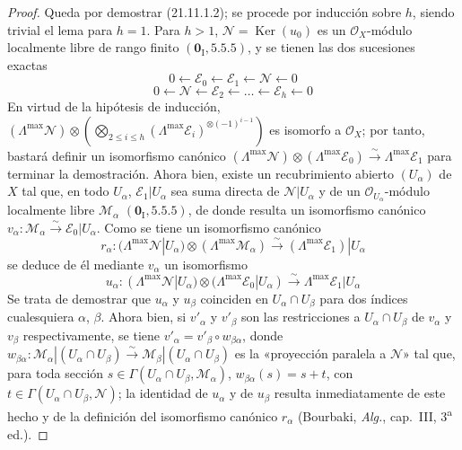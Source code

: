 \begin{proof}
Queda por demostrar (21.11.1.2); se procede por inducción sobre $h$, siendo trivial el lema
para $h=1$. Para $h>1$, $\mathscr N=\operatorname{Ker}(u_0)$ es un
$\mathcal O_X$-módulo localmente libre de rango finito $(\mathbf 0_{\mathrm I}, 5.5.5)$,
y se tienen las dos sucesiones exactas
\[
  0\leftarrow\mathscr E_0\leftarrow\mathscr E_1
  \leftarrow\mathscr N\leftarrow0
\]
\[
  0\leftarrow\mathscr N\leftarrow\mathscr E_2
  \leftarrow\ldots\leftarrow\mathscr E_h\leftarrow0
\]
En virtud de la hipótesis de inducción,
$(\Lambda^{\max}\mathscr N)\otimes
(\bigotimes_{2\leq i\leq h}(\Lambda^{\max}\mathscr E_i)^{\otimes(-1)^{i-1}})$
es isomorfo a $\mathcal O_X$; por tanto, bastará definir un isomorfismo canónico
$(\Lambda^{\max}\mathscr N)\otimes(\Lambda^{\max}\mathscr E_0)\xrightarrow{\sim}\Lambda^{\max}\mathscr E_1$
para terminar la demostración. Ahora bien, existe un recubrimiento abierto $(U_\alpha)$ de
$X$ tal que, en todo $U_\alpha$, $\mathscr E_1|U_\alpha$ sea suma directa de
$\mathscr N|U_\alpha$ y de un $\mathcal O_{U_\alpha}$-módulo localmente libre
$\mathscr M_\alpha$ $(\mathbf 0_{\mathrm I}, 5.5.5)$, de donde resulta un isomorfismo canónico
$v_\alpha:\mathscr M_\alpha\xrightarrow{\sim}\mathscr E_0|U_\alpha$.
Como se tiene un isomorfismo canónico
\[
  r_\alpha:(\Lambda^{\max}\mathscr N|U_\alpha)
  \otimes(\Lambda^{\max}\mathscr M_\alpha)
  \xrightarrow{\sim}(\Lambda^{\max}\mathscr E_1)|U_\alpha
\]
se deduce de él mediante $v_\alpha$ un isomorfismo
\[
  u_\alpha:(\Lambda^{\max}\mathscr N|U_\alpha)
  \otimes(\Lambda^{\max}\mathscr E_0|U_\alpha)
  \xrightarrow{\sim}\Lambda^{\max}\mathscr E_1|U_\alpha
\]
Se trata de demostrar que $u_\alpha$ y $u_\beta$ coinciden en
$U_\alpha\cap U_\beta$ para dos índices cualesquiera $\alpha$, $\beta$. Ahora bien, si
$v'_\alpha$ y $v'_\beta$ son las restricciones a $U_\alpha\cap U_\beta$ de
$v_\alpha$ y $v_\beta$ respectivamente, se tiene
$v'_\alpha=v'_\beta\circ w_{\beta\alpha}$, donde
$w_{\beta\alpha}:\mathscr M_\alpha|(U_\alpha\cap U_\beta)\xrightarrow{\sim}\mathscr M_\beta|(U_\alpha\cap U_\beta)$
es la «proyección paralela a $\mathscr N$» tal que, para toda sección
$s\in\Gamma(U_\alpha\cap U_\beta,\mathscr M_\alpha)$,
$w_{\beta\alpha}(s)=s+t$, con
$t\in\Gamma(U_\alpha\cap U_\beta,\mathscr N)$; la identidad de $u_\alpha$ y de
$u_\beta$ resulta inmediatamente de este hecho y de la definición del isomorfismo canónico
$r_\alpha$ (Bourbaki, \emph{Alg.}, cap.~III, 3\textsuperscript{a} ed.).
\end{proof}
